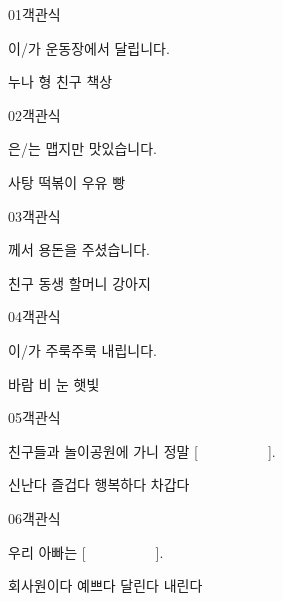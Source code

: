\documentclass[fs95,seriesFre]{korfarm-base}
\begin{document}
\begin{kfQBlock}{01}{객관식}
\begin{kfEvidence}[　　　　　]이/가 운동장에서 달립니다.\end{kfEvidence}
\begin{kfChoices}
\kfChoice 누나
\kfChoice 형
\kfChoice 친구
\kfChoice 책상
\end{kfChoices}
\end{kfQBlock}
\begin{kfQBlock}{02}{객관식}
\begin{kfEvidence}[　　　　　]은/는 맵지만 맛있습니다.\end{kfEvidence}
\begin{kfChoices}
\kfChoice 사탕
\kfChoice 떡볶이
\kfChoice 우유
\kfChoice 빵
\end{kfChoices}
\end{kfQBlock}
\begin{kfQBlock}{03}{객관식}
\begin{kfEvidence}[　　　　　]께서 용돈을 주셨습니다.\end{kfEvidence}
\begin{kfChoices}
\kfChoice 친구
\kfChoice 동생
\kfChoice 할머니
\kfChoice 강아지
\end{kfChoices}
\end{kfQBlock}
\begin{kfQBlock}{04}{객관식}
\begin{kfEvidence}[　　　　　]이/가 주룩주룩 내립니다.\end{kfEvidence}
\begin{kfChoices}
\kfChoice 바람
\kfChoice 비
\kfChoice 눈
\kfChoice 햇빛
\end{kfChoices}
\end{kfQBlock}
\begin{kfQBlock}{05}{객관식}
\begin{kfEvidence}친구들과 놀이공원에 가니 정말 [　　　　　].\end{kfEvidence}
\begin{kfChoices}
\kfChoice 신난다
\kfChoice 즐겁다
\kfChoice 행복하다
\kfChoice 차갑다
\end{kfChoices}
\end{kfQBlock}
\begin{kfQBlock}{06}{객관식}
\begin{kfEvidence}우리 아빠는 [　　　　　].\end{kfEvidence}
\begin{kfChoices}
\kfChoice 회사원이다
\kfChoice 예쁘다
\kfChoice 달린다
\kfChoice 내린다
\end{kfChoices}
\end{kfQBlock}
\end{document}
